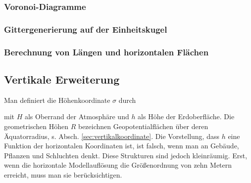 \documentclass{book}
\begin{document}
\subsubsection{Voronoi-Diagramme}
\label{sec:voronoi-diagramme}

\subsubsection{Gittergenerierung auf der Einheitskugel}
\label{sec:gittergenerierung_auf_der_einheitskugel}

\subsubsection{Berechnung von Längen und horizontalen Flächen}
\label{sec:berechung_von_längen_und_horizontalen_flächen}

\subsection{Vertikale Erweiterung}
\label{sec:vertikale_erweiterung}

Man definiert die Höhenkoordinate $\sigma$ durch
%
\begin{center}
\end{center}
%
mit $H$ als Oberrand der Atmosphäre und $h$ als Höhe der Erdoberfläche. Die geometrischen Höhen $R$ bezeichnen Geopotentialflächen über deren Äquatorradius, s. Absch. \ref{sec:vertikalkoordinate}. Die Vorstellung, dass $h$ eine Funktion der horizontalen Koordinaten ist, ist falsch, wenn man an Gebäude, Pflanzen und Schluchten denkt. Diese Strukturen sind jedoch kleinräumig. Erst, wenn die horizontale Modellauflösung die Größenordnung von zehn Metern erreicht, muss man sie berücksichtigen.
\end{document}
